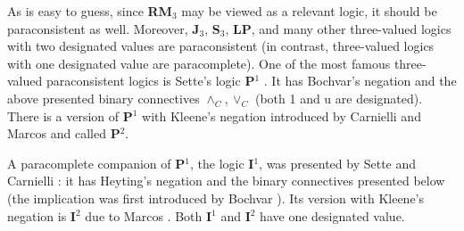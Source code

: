 \documentclass[11pt,a4paper,titlepage]{article}
\theoremstyle{definition}
\newcommand{\3}{\vspace{.3in}}
\newcommand{\2}{\vspace{.2in}}
\newcommand{\1}{\vspace{.1in}}
\newcommand{\5}{\vspace{.05in}}
\begin{document}
As is easy to guess, since {\bf RM$_3$} may be viewed as a relevant logic, it should be paraconsistent as well. Moreover, {\bf J$_3$}, {\bf S$_3$}, {\bf LP}, and many other three-valued logics with two designated values are paraconsistent (in contrast, three-valued logics with one designated value are paracomplete). One of the most famous three-valued paraconsistent logics is Sette's logic {\bf P$ ^1 $} \cite{Sette}. It has Bochvar's negation and the above presented binary connectives $\wedge_C, \vee_C$  (both 1 and u are designated). There is a version of {\bf P$ ^1 $} with Kleene's negation introduced by Carnielli and Marcos \cite{CarnielliMarcos,Marcos} and called {\bf P$ ^2 $}.

A paracomplete companion of {\bf P$ ^1 $}, the logic {\bf I$ ^1 $}, was presented by Sette and Carnielli \cite{SetteCarnieli}: it has Heyting's negation and the binary connectives presented below (the implication was first introduced by Bochvar \cite{Bochvar}). Its version with Kleene's negation is {\bf I$ ^2 $} due to Marcos \cite{Marcos}. Both {\bf I$ ^1 $} and {\bf I$ ^2 $} have one designated value.
\end{document}
